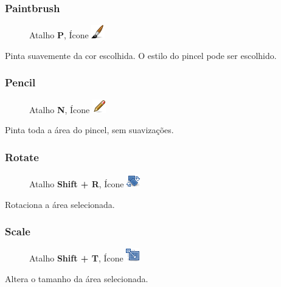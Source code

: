 \documentclass[12pt,onecolumn]{article}
\begin{document}
    \subsubsection{Paintbrush}
      \begin{figure}[H]
        Atalho {\bf P}, Ícone
        \includegraphics{gimp-icons/stock-tool-paintbrush-22.png}
        \label{fig:brush}
      \end{figure}
      Pinta suavemente da cor escolhida. O estilo do pincel pode ser escolhido.
      
    \subsubsection{Pencil}
      \begin{figure}[H]
        Atalho {\bf N}, Ícone
        \includegraphics{gimp-icons/stock-tool-pencil-22.png}
        \label{fig:pencil}
      \end{figure}
      Pinta toda a área do pincel, sem suavizações.
      
    \subsubsection{Rotate}
      \begin{figure}[H]
        Atalho {\bf Shift + R}, Ícone
        \includegraphics{gimp-icons/stock-tool-rotate-22.png}
        \label{fig:rotate}
      \end{figure}
      Rotaciona a área selecionada.
      
    \subsubsection{Scale}
      \begin{figure}[H]
        Atalho {\bf Shift + T}, Ícone
        \includegraphics{gimp-icons/stock-tool-scale-22.png}
        \label{fig:scale}
      \end{figure}
      Altera o tamanho da área selecionada.
\end{document}
